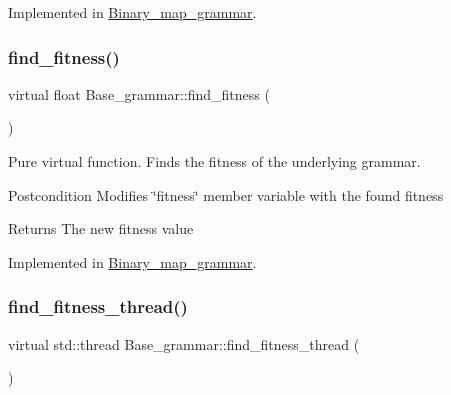 Implemented in \mbox{\hyperlink{classBinary__map__grammar_a701a7d073e76cea7dfedfbd514c3fac7}{Binary\+\_\+map\+\_\+grammar}}.

\mbox{\label{classBase__grammar_a4a302ebcebff2c63ff92eed93cfb5323}} 
\subsubsection{\texorpdfstring{find\_fitness()}{find\_fitness()}}
{\footnotesize\ttfamily virtual float Base\+\_\+grammar\+::find\+\_\+fitness (\begin{DoxyParamCaption}{ }\end{DoxyParamCaption})\hspace{0.3cm}{\ttfamily [pure virtual]}}



Pure virtual function. Finds the fitness of the underlying grammar. 

\begin{DoxyPostcond}{Postcondition}
Modifies \char`\"{}fitness\char`\"{} member variable with the found fitness 
\end{DoxyPostcond}
\begin{DoxyReturn}{Returns}
The new fitness value 
\end{DoxyReturn}


Implemented in \mbox{\hyperlink{classBinary__map__grammar_ac582d7d468099817506ae54b346de08d}{Binary\+\_\+map\+\_\+grammar}}.

\mbox{\label{classBase__grammar_ae89dff40e2380073bfd9f8ca8f5579f7}} 
\subsubsection{\texorpdfstring{find\_fitness\_thread()}{find\_fitness\_thread()}}
{\footnotesize\ttfamily virtual std\+::thread Base\+\_\+grammar\+::find\+\_\+fitness\+\_\+thread (\begin{DoxyParamCaption}{ }\end{DoxyParamCaption})\hspace{0.3cm}{\ttfamily [pure virtual]}}



